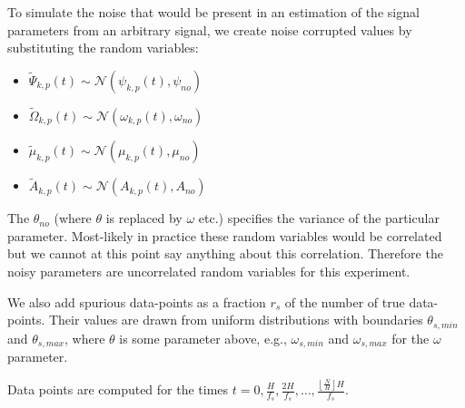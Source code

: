 To simulate the noise that would be present in an estimation of the signal
parameters from an arbitrary signal, we create noise corrupted values by
substituting the random variables:
\begin{itemize}
    \item
        $\tilde{\Psi}_{k,p}(t) \sim
        \mathcal{N}(\psi_{k,p}(t),\psi_{no})$
    \item
        $\tilde{\Omega}_{k,p}(t) \sim
        \mathcal{N}(\omega_{k,p}(t),\omega_{no})$
    \item
        $\tilde{\mu}_{k,p}(t) \sim
        \mathcal{N}(\mu_{k,p}(t),\mu_{no})$
    \item
        $\tilde{A}_{k,p}(t) \sim
        \mathcal{N}(A_{k,p}(t),A_{no})$
\end{itemize}
The $\theta_{no}$ (where $\theta$ is replaced by $\omega$ etc.) specifies the
variance of the particular parameter. Most-likely in practice these random
variables would be correlated but we cannot at this point say anything about
this correlation. Therefore the noisy parameters are uncorrelated random
variables for this experiment.

We also add spurious data-points as a fraction $r_{s}$ of the number of true
data-points. Their values are drawn from uniform distributions with boundaries
$\theta_{s,min}$ and $\theta_{s,max}$, where $\theta$ is some parameter above,
e.g., $\omega_{s,min}$ and $\omega_{s,max}$ for the $\omega$ parameter.

Data points are computed for the times $t = 0,\frac{H}{f_{s}},\frac{2
H}{f_{s}},\ldots,\frac{\left\lfloor \frac{N}{H} \right\rfloor H}{f_{s}}$.

